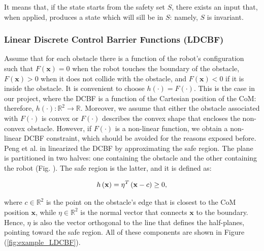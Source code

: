 \documentclass[main.tex]{subfiles}
\begin{document}
It means that, if the state starts from the safety set $S$, there exists an input that, when applied, produces a state which will sill be in $S$: namely, $S$ is invariant.

\subsubsection{Linear Discrete Control Barrier Functions (LDCBF)}
Assume that for each obstacle there is a function of the robot's configuration such that $F(\mathbf{x})=0$ when the robot touches the boundary of the obstacle, $F(\mathbf{x})>0$ when it does not collide with the obstacle, and $F(\mathbf{x})<0$ if it is inside the obstacle. It is convenient to choose $h(\cdot)=F(\cdot)$. This is the case in our project, where the DCBF is a function of the Cartesian position of the CoM: therefore, $h(\cdot)\colon \mathbb{R}^2 \rightarrow \mathbb{R}$. Moreover, we assume that either the obstacle associated with $F(\cdot)$ is convex or $F(\cdot)$ describes the convex shape that encloses the non-convex obstacle.
However, if $F(\cdot)$ is a non-linear function, we obtain a non-linear DCBF constraint, which should be avoided for the reasons exposed before.\\
Peng et al. in \cite{peng_main_paper} linearized the DCBF by approximating the safe region. The plane is partitioned in two halves: one containing the obstacle and the other containing the robot (Fig. ). %
The safe region is the latter, and it is defined as:

\begin{equation} \notag
h\left(\mathbf{x}\right) = \eta^T \left(\mathbf{x} - c\right) \geq 0,
\end{equation}

where $c \in \mathbb{R}^2$ is the point on the obstacle's edge that is closest to the CoM position $\mathbf{x}$, while $\eta \in \mathbb{R}^2$ is the normal vector that connects $\mathbf{x}$ to the boundary. Hence, $\eta$ is also the vector orthogonal to the line that defines the half-planes, pointing toward the safe region. All of these components are shown in Figure (\ref{fig:example_LDCBF}).\\
\end{document}
